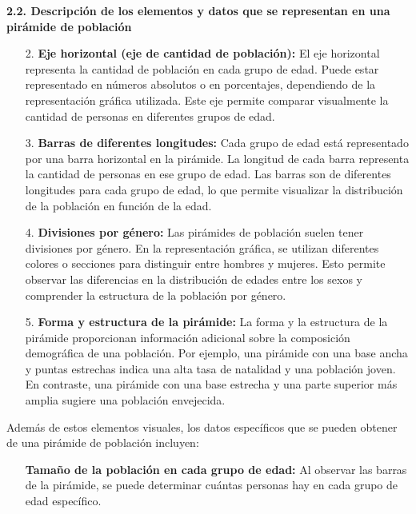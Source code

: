 \documentclass[8pt,a4paper]{beamer}
\begin{document}
{\begin{frame}{}
\begin{block}{\textbf{2.2. Descripción de los elementos y datos que se representan en una pirámide de población}}
\begin{enumerate}
\item[2.] \textbf{Eje horizontal (eje de cantidad de población):} El eje horizontal representa la cantidad de población en cada grupo de edad. Puede estar representado en números absolutos o en porcentajes, dependiendo de la representación gráfica utilizada. Este eje permite comparar visualmente la cantidad de personas en diferentes grupos de edad.

\item[3.] \textbf{Barras de diferentes longitudes:} Cada grupo de edad está representado por una barra horizontal en la pirámide. La longitud de cada barra representa la cantidad de personas en ese grupo de edad. Las barras son de diferentes longitudes para cada grupo de edad, lo que permite visualizar la distribución de la población en función de la edad.
\end{enumerate}
\end{block}
\end{frame}

\begin{frame}{}
\begin{block}{}
\justifying
\begin{enumerate}
\justifying
\item[4.] \textbf{Divisiones por género:} Las pirámides de población suelen tener divisiones por género. En la representación gráfica, se utilizan diferentes colores o secciones para distinguir entre hombres y mujeres. Esto permite observar las diferencias en la distribución de edades entre los sexos y comprender la estructura de la población por género.

\item[5.] \textbf{Forma y estructura de la pirámide:} La forma y la estructura de la pirámide proporcionan información adicional sobre la composición demográfica de una población. Por ejemplo, una pirámide con una base ancha y puntas estrechas indica una alta tasa de natalidad y una población joven. En contraste, una pirámide con una base estrecha y una parte superior más amplia sugiere una población envejecida.
\end{enumerate}
Además de estos elementos visuales, los datos específicos que se pueden obtener de una pirámide de población incluyen:
\begin{itemize}
\justifying
\item[\ding{65}] \textbf{Tamaño de la población en cada grupo de edad:} Al observar las barras de la pirámide, se puede determinar cuántas personas hay en cada grupo de edad específico.
\end{itemize}
\end{block}
\end{frame}

}
\end{document}

